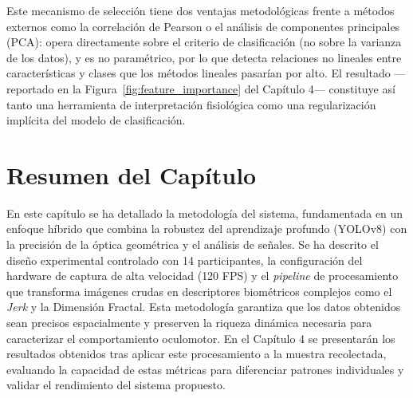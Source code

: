 Este mecanismo de selección tiene dos ventajas metodológicas frente a métodos externos como la correlación de Pearson o el análisis de componentes principales (PCA): opera directamente sobre el criterio de clasificación (no sobre la varianza de los datos), y es no paramétrico, por lo que detecta relaciones no lineales entre características y clases que los métodos lineales pasarían por alto. El resultado —reportado en la Figura~\ref{fig:feature_importance} del Capítulo 4— constituye así tanto una herramienta de interpretación fisiológica como una regularización implícita del modelo de clasificación.

\section{Resumen del Capítulo}

En este capítulo se ha detallado la metodología del sistema, fundamentada en un enfoque híbrido que combina la robustez del aprendizaje profundo (YOLOv8) con la precisión de la óptica geométrica y el análisis de señales.
Se ha descrito el diseño experimental controlado con 14 participantes, la configuración del hardware de captura de alta velocidad (120 FPS) y el \textit{pipeline} de procesamiento que transforma imágenes crudas en descriptores biométricos complejos como el \textit{Jerk} y la Dimensión Fractal.
Esta metodología garantiza que los datos obtenidos sean precisos espacialmente y preserven la riqueza dinámica necesaria para caracterizar el comportamiento oculomotor.
En el Capítulo 4 se presentarán los resultados obtenidos tras aplicar este procesamiento a la muestra recolectada, evaluando la capacidad de estas métricas para diferenciar patrones individuales y validar el rendimiento del sistema propuesto.